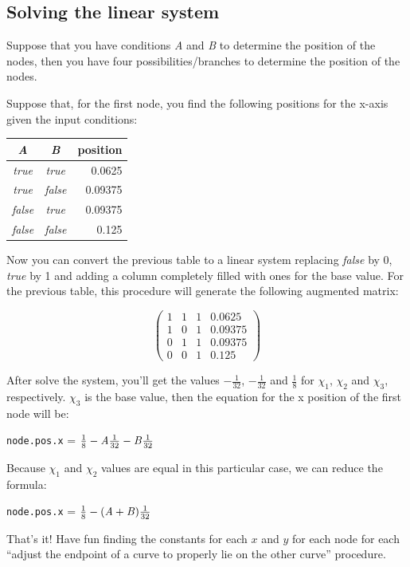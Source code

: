 \subsection{Solving the linear system}

Suppose that you have conditions \emph{A} and \emph{B} to determine the position
of the nodes, then you have four possibilities/branches to determine the
position of the nodes.

Suppose that, for the first node, you find the following positions for the
x-axis given the input conditions:

\begin{center}
  \begin{tabular}{|c|c|r|}
    \hline
    \textbf{\emph{A}} & \textbf{\emph{B}} & position \\
    \hline
    \emph{true} & \emph{true} & 0.0625 \\
    \emph{true} & \emph{false} & 0.09375 \\
    \emph{false} & \emph{true} & 0.09375 \\
    \emph{false} & \emph{false} & 0.125 \\
    \hline
  \end{tabular}
\end{center}

Now you can convert the previous table to a linear system replacing \emph{false}
by 0, \emph{true} by 1 and adding a column completely filled with ones for the
base value. For the previous table, this procedure will generate the following
augmented matrix:

$$\left(
  \begin{array}{ccc|r}
    1 & 1 & 1 & 0.0625 \\
    1 & 0 & 1 & 0.09375 \\
    0 & 1 & 1 & 0.09375 \\
    0 & 0 & 1 & 0.125
  \end{array}
\right)$$

After solve the system, you'll get the values $-\frac{1}{32}$, $-\frac{1}{32}$
and $\frac{1}{8}$ for $\chi_1$, $\chi_2$ and $\chi_3$, respectively. $\chi_3$ is
the base value, then the equation for the x position of the first node will be:

\begin{center}
  \texttt{node.pos.x} = $\frac{1}{8} - \text{\emph{A}} \frac{1}{32}
  - \text{\emph{B}} \frac{1}{32}$
\end{center}

Because $\chi_1$ and $\chi_2$ values are equal in this particular case, we can
reduce the formula:

\begin{center}
  \texttt{node.pos.x} = $\frac{1}{8} - (\text{\emph{A}}
  + \text{\emph{B}}) \frac{1}{32}$
\end{center}

That's it! Have fun finding the constants for each $x$ and $y$ for each node for
each ``adjust the endpoint of a curve to properly lie on the other curve''
procedure.
